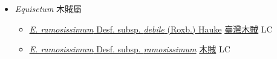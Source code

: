 
  \begin{itemize}
 \item[] \textit{Equisetum} 木賊屬
                    
  \begin{itemize}
        \item[] \href{http://www.theplantlist.org/tpl1.1/search?q=Equisetum+ramosissimum+subsp.+debile}{\textit{E. ramosissimum} Desf. subsp. \textit{debile} (Roxb.) Hauke}   \href{\detokenize{http://taibnet.sinica.edu.tw/chi/taibnet_species_list.php?T2=臺灣木賊&T2_new_value=true&fr=y}}{臺灣木賊} LC
        \item[] \href{http://www.theplantlist.org/tpl1.1/search?q=Equisetum+ramosissimum+subsp.+ramosissimum}{\textit{E. ramosissimum} Desf. subsp. \textit{ramosissimum}}   \href{\detokenize{http://taibnet.sinica.edu.tw/chi/taibnet_species_list.php?T2=木賊&T2_new_value=true&fr=y}}{木賊} LC
  \end{itemize}
  \end{itemize}
